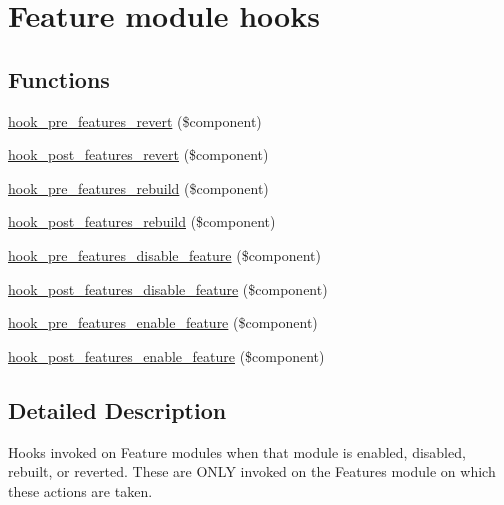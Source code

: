 \hypertarget{group__features__module__hooks}{
\section{Feature module hooks}
\label{group__features__module__hooks}
}
\subsection*{Functions}
\begin{DoxyCompactItemize}
\item 
\hyperlink{group__features__module__hooks_ga4a6a86e3c70a00dc2b669163bfbbc0f5}{hook\_\-pre\_\-features\_\-revert} (\$component)
\item 
\hyperlink{group__features__module__hooks_ga07210a0c5a329f85a59721ab646b1c6e}{hook\_\-post\_\-features\_\-revert} (\$component)
\item 
\hyperlink{group__features__module__hooks_ga237e63a64bdf40cd41907ed20eb25a6a}{hook\_\-pre\_\-features\_\-rebuild} (\$component)
\item 
\hyperlink{group__features__module__hooks_gafc175b1136fef7d44bb5ebd25aea01ac}{hook\_\-post\_\-features\_\-rebuild} (\$component)
\item 
\hyperlink{group__features__module__hooks_ga506df36825e0deb9a42e8d03e522ee27}{hook\_\-pre\_\-features\_\-disable\_\-feature} (\$component)
\item 
\hyperlink{group__features__module__hooks_ga4a6a8c00bd960ec796014920561ca9b9}{hook\_\-post\_\-features\_\-disable\_\-feature} (\$component)
\item 
\hyperlink{group__features__module__hooks_gaa07fa9cd3758939db8a7be925e3d2a42}{hook\_\-pre\_\-features\_\-enable\_\-feature} (\$component)
\item 
\hyperlink{group__features__module__hooks_ga1a213ea8ab58bc38bc9064ee0e5ecffd}{hook\_\-post\_\-features\_\-enable\_\-feature} (\$component)
\end{DoxyCompactItemize}


\subsection{Detailed Description}
Hooks invoked on Feature modules when that module is enabled, disabled, rebuilt, or reverted. These are ONLY invoked on the Features module on which these actions are taken. 

